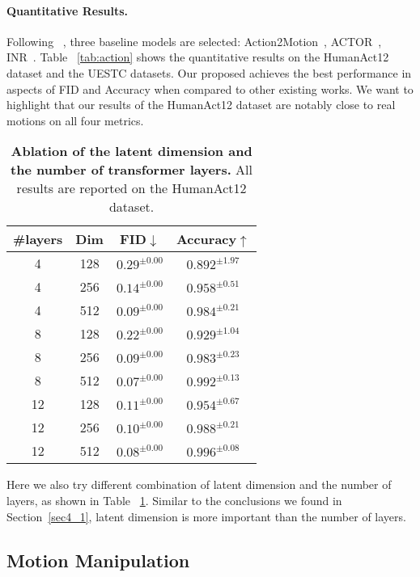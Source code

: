 \paragraph{Quantitative Results.}\label{sec4_2_4} Following ~\cite{cervantes2022implicit}, three baseline models are selected: Action2Motion~\citep{guo2020action2motion}, ACTOR~\citep{petrovich2021action}, INR~\citep{cervantes2022implicit}. Table ~\ref{tab:action} shows the quantitative results on the HumanAct12 dataset and the UESTC datasets. Our proposed \name achieves the best performance in aspects of FID and Accuracy when compared to other existing works. We want to highlight that our results of the HumanAct12 dataset are notably close to real motions on all four metrics. 


\begin{table}[ht]
\centering
\caption{\textbf{Ablation of the latent dimension and the number of transformer layers.} All results are reported on the HumanAct12 dataset.}
\label{tab:action_feat_layer}
\setlength{\tabcolsep}{1.4mm}
{
\begin{tabular}{cccc}
\hline

\#layers & Dim & FID$\downarrow$ & Accuracy$\uparrow$  \\
\hline
4 & 128 & $0.29^{\pm0.00}$ & $0.892^{\pm1.97}$ \\
4 & 256 & $0.14^{\pm0.00}$ & $0.958^{\pm0.51}$ \\
4 & 512 & $0.09^{\pm0.00}$ & $0.984^{\pm0.21}$ \\
8 & 128 & $0.22^{\pm0.00}$ & $0.929^{\pm1.04}$ \\
8 & 256 & $0.09^{\pm0.00}$ & $0.983^{\pm0.23}$ \\
8 & 512 & $\mathbf{0.07^{\pm0.00}}$ & $0.992^{\pm0.13}$ \\
12 & 128 & $0.11^{\pm0.00}$ & $0.954^{\pm0.67}$ \\
12 & 256 & $0.10^{\pm0.00}$ & $0.988^{\pm0.21}$ \\
12 & 512 & $0.08^{\pm0.00}$ & $\mathbf{0.996^{\pm0.08}}$ \\
\hline
\end{tabular}}
\end{table}

Here we also try different combination of latent dimension and the number of layers, as shown in Table ~\ref{tab:action_feat_layer}. Similar to the conclusions we found in Section~\ref{sec4_1}, latent dimension is more important than the number of layers.


\subsection{Motion Manipulation}\label{sec4_3}

